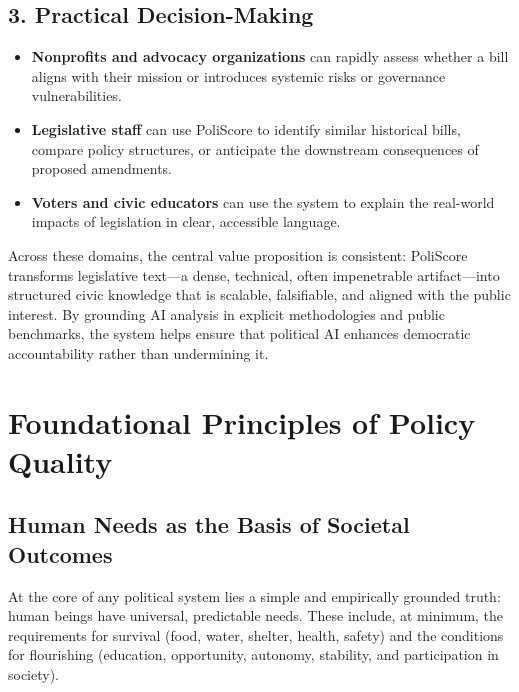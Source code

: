 \documentclass[12pt]{article}
\begin{document}
\subsection*{3. Practical Decision-Making}
\begin{itemize}
    \item \textbf{Nonprofits and advocacy organizations} can rapidly assess whether a bill aligns with their mission or
    introduces systemic risks or governance vulnerabilities.
    \item \textbf{Legislative staff} can use PoliScore to identify similar historical bills, compare policy structures,
    or anticipate the downstream consequences of proposed amendments.
    \item \textbf{Voters and civic educators} can use the system to explain the real-world impacts of legislation in
    clear, accessible language.
\end{itemize}

Across these domains, the central value proposition is consistent: PoliScore transforms legislative text—a dense,
technical, often impenetrable artifact—into structured civic knowledge that is scalable, falsifiable, and aligned with
the public interest. By grounding AI analysis in explicit methodologies and public benchmarks, the system helps ensure
that political AI enhances democratic accountability rather than undermining it.




\section{Foundational Principles of Policy Quality}
\label{sec:foundations}

\subsection{Human Needs as the Basis of Societal Outcomes}

At the core of any political system lies a simple and empirically grounded truth: human beings have universal, predictable
needs. These include, at minimum, the requirements for survival (food, water, shelter, health, safety) and the conditions
for flourishing (education, opportunity, autonomy, stability, and participation in society).
\end{document}

